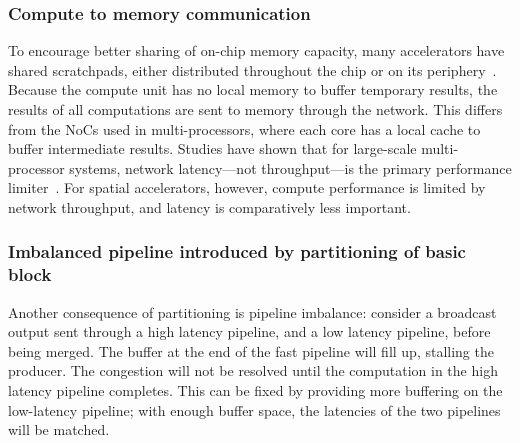 \subsubsection{Compute to memory communication}
To encourage better sharing of on-chip memory capacity, many accelerators have shared scratchpads, either distributed throughout the chip or on its periphery~\cite{plasticine, brainwave, streamdataflow}.
Because the compute unit has no local memory to buffer temporary results, the results of all computations are sent to memory through the network.
This differs from the NoCs used in multi-processors, where each core has a local cache to buffer intermediate results.
Studies have shown that for large-scale multi-processor systems, network latency---not throughput---is the primary performance limiter~\cite{noc}.
For spatial accelerators, however, compute performance is limited by network throughput, and latency is comparatively less important.

\subsubsection{Imbalanced pipeline introduced by partitioning of basic block}
Another consequence of partitioning is pipeline imbalance: consider a broadcast output sent through a high latency pipeline, and a low latency pipeline, before being merged.
The buffer at the end of the fast pipeline will fill up, stalling the producer.
The congestion will not be resolved until the computation in the high latency pipeline completes.
This can be fixed by providing more buffering on the low-latency pipeline; with enough buffer space, the latencies of the two pipelines will be matched.
\fi


